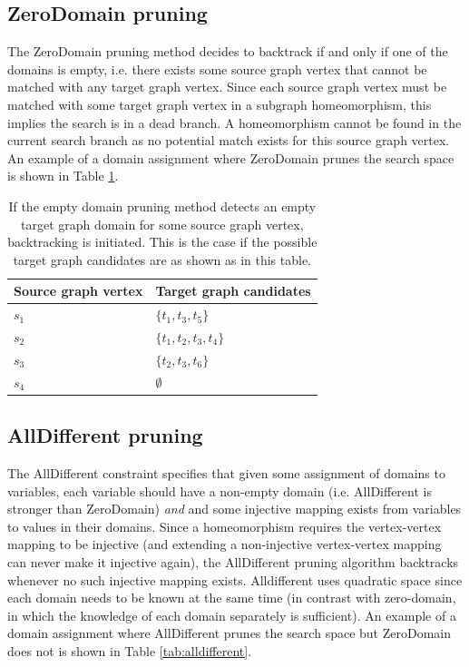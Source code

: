 \subsection{ZeroDomain pruning}
\label{sec:zerodomainpruning}
The ZeroDomain pruning method decides to backtrack if and only if one of the domains is empty, i.e. there exists some source graph vertex that cannot be matched with any target graph vertex. Since each source graph vertex must be matched with some target graph vertex in a subgraph homeomorphism, this implies the search is in a dead branch. A homeomorphism cannot be found in the current search branch as no potential match exists for this source graph vertex. An example of a domain assignment where ZeroDomain prunes the search space is shown in Table \ref{tab:zerodomain}.

\label{sec:emptyDomain}
\begin{table}
\centering
\begin{tabular}{|l|l|}
\hline
\textbf{Source graph vertex} & \textbf{Target graph candidates} \\ \hline
$s_1$                          & $\{t_1, t_3, t_5\}$         \\ \hline
$s_2$                          & $\{t_1, t_2, t_3, t_4\}$       \\ \hline
$s_3$                          & $\{t_2, t_3, t_6\}$      \\ \hline
$s_4$                          & $\emptyset$                      \\ \hline
\end{tabular}
\caption{If the empty domain pruning method detects an empty target graph domain for some source graph vertex, backtracking is initiated. This is the case if the possible target graph candidates are as shown as in this table.}
\label{tab:zerodomain}
\end{table}

\subsection{AllDifferent pruning}
\label{sec:alldifferent}
The AllDifferent constraint specifies that given some assignment of domains to variables, each variable should have a non-empty domain (i.e. AllDifferent is stronger than ZeroDomain) \textit{and} and some injective mapping exists from variables to values in their domains. Since a homeomorphism requires the vertex-vertex mapping to be injective (and extending a non-injective vertex-vertex mapping can never make it injective again), the AllDifferent pruning algorithm backtracks whenever no such injective mapping exists. Alldifferent uses quadratic space since each domain needs to be known at the same time (in contrast with zero-domain, in which the knowledge of each domain separately is sufficient). An example of a domain assignment where AllDifferent prunes the search space but ZeroDomain does not is shown in Table \ref{tab:alldifferent}. 

